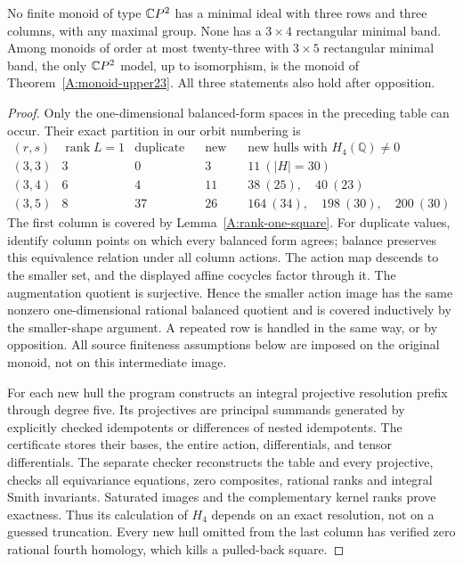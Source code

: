 \begin{proposition}
\label{A:three-row-classification}
No finite monoid of type $\mathbb{C}P^2$ has a minimal ideal with
three rows and three columns, with any maximal group. None has
a $3\times4$ rectangular minimal band. Among monoids of order
at most twenty-three with $3\times5$ rectangular minimal band,
the only $\mathbb{C}P^2$ model, up to isomorphism, is the monoid of
Theorem~\ref{A:monoid-upper23}. All three statements also hold
after opposition.
\end{proposition}
\begin{proof}
Only the one-dimensional balanced-form spaces in the preceding
table can occur. Their exact partition in our orbit numbering is
\[
\begin{array}{c|r|r|r|l}
 (r,s)&\operatorname{rank}L=1&\text{duplicate values}
 &\text{new hulls}&\text{new hulls with }H_4(\mathbb Q)\ne0\\\hline
 (3,3)&3&0&3&11\ (|H|=30)\\
 (3,4)&6&4&11&38\ (25),\quad40\ (23)\\
 (3,5)&8&37&26&164\ (34),\quad198\ (30),\quad200\ (30)
\end{array}
\]
The first column is covered by Lemma~\ref{A:rank-one-square}.
For duplicate values, identify column points on which every
balanced form agrees; balance preserves this equivalence
relation under all column actions. The action map descends to
the smaller set, and the displayed affine cocycles factor
through it. The augmentation quotient is surjective. Hence
the smaller action image has the same nonzero one-dimensional
rational balanced quotient and is covered inductively by the
smaller-shape argument. A repeated row is handled in the same
way, or by opposition. All source finiteness assumptions below
are imposed on the original monoid, not on this intermediate
image.

For each new hull the program
 constructs an integral
projective resolution prefix through degree five. Its projectives
are principal summands generated by explicitly checked idempotents
or differences of nested idempotents. The certificate stores their
bases, the entire action, differentials, and tensor differentials.
The separate checker
 reconstructs the
table and every projective, checks all equivariance equations,
zero composites, rational ranks and integral Smith invariants.
Saturated images and the complementary kernel ranks prove exactness.
Thus its calculation of $H_4$ depends on an exact resolution,
not on a guessed truncation. Every new hull omitted from the
last column has verified zero rational fourth homology, which
kills a pulled-back square.


\end{proof}
